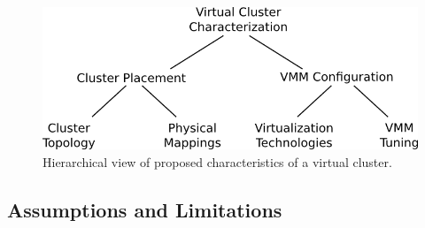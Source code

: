 \documentclass[11pt]{article}
\begin{document}
\begin{figure}[h!]
\centering
\includegraphics[scale=1.0]{figures/vcluster.png} 
\caption{Hierarchical view of proposed characteristics of a virtual cluster.}
\label{fig:vcluster}
\end{figure}

\subsection{Assumptions and Limitations}
\end{document}
